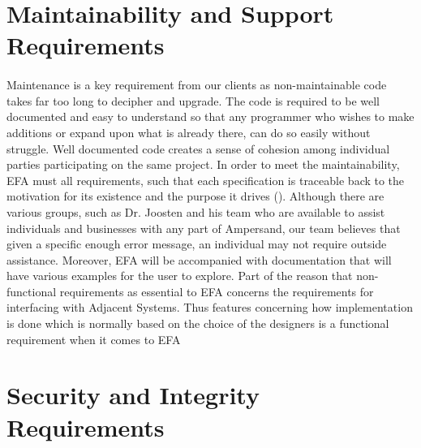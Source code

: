 \documentclass[12pt]{report}
\begin{document}
\section{Maintainability and Support Requirements}\label{sec:Support}
\paragraph*{}
Maintenance is a key requirement from our clients as non-maintainable code takes far too long to 
decipher and upgrade. The code is required to be well documented and easy to understand so that any 
programmer who wishes to make additions or expand upon what is already there, can do so easily 
without struggle. Well documented code creates a sense of cohesion among individual parties 
participating on the same project. In order to meet the maintainability, EFA must all 
requirements, such that each specification is traceable back to the motivation for its existence 
and the purpose it drives (\cite[2]{derFun}).
Although there are various groups, such as Dr. Joosten and his team who are available to assist 
individuals and businesses with any part of Ampersand, our team believes that given a specific 
enough error message, an individual may not require outside assistance. Moreover, EFA will be 
accompanied with documentation that will have various examples for the user to explore. 
Part of the reason that non-functional requirements as essential to EFA concerns the 
requirements for interfacing with Adjacent Systems. Thus features concerning how implementation is 
done which is normally based on the choice of the designers is a functional requirement when it 
comes to EFA 
  

\section{Security and Integrity Requirements}\label{sec:Security}
\end{document}
